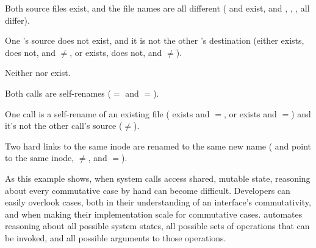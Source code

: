 \begin{CompactItemize}
\item Both source files exist, and the file names are all different
      ( and  exist, and , , ,
       all differ).

\item One 's source does not exist, and it is not the
      other 's destination (either
       exists,  does not, and $\neq$, or
       exists,  does not, and $\neq$).

\item Neither  nor  exist.

\item Both calls are self-renames ($=$ and $=$).

\item One call is a self-rename of an existing file
      ( exists and $=$, or
        exists and $=$) and
      it's not the other call's source ($\neq$).

\item Two hard links to the same inode are renamed to the same new name
      ( and  point to the same inode,
       $\neq$, and $=$).

\end{CompactItemize}

As this example shows, when system calls access shared, mutable
state, reasoning about every commutative case by hand can become
difficult.
%
Developers can easily overlook cases, both in their
understanding of an interface's commutativity, and when making their
implementation scale for commutative cases.
%
\analyzer
automates reasoning about all possible system states, all possible
sets of operations that can be
invoked, and all possible arguments to those operations.



